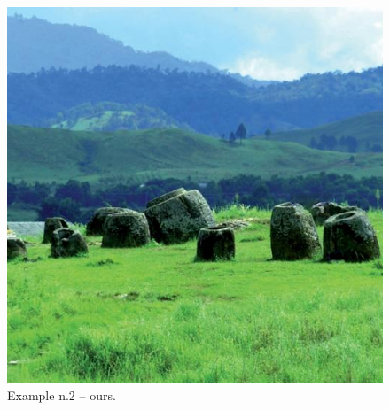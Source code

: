 \documentclass[a4paper, 11pt]{article}
\begin{document}
\begin{figure}
    \centering
    \includegraphics[width=.95\linewidth]{documentation/img/modified/0008.png}
    \caption{Example n.2 -- ours.}
    \label{img:ex_n.2_mask}
\end{figure}
\end{document}
